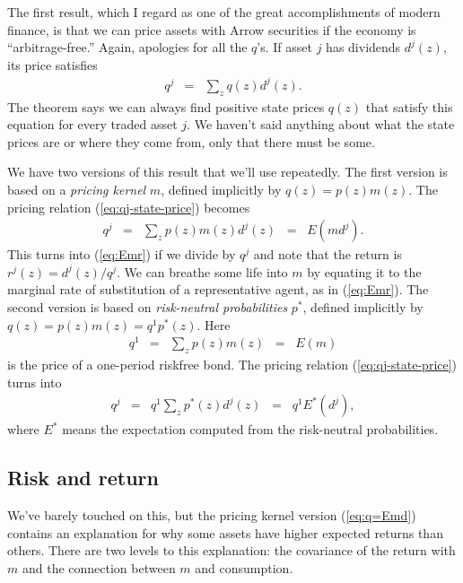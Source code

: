 \documentclass[11pt]{article}
\begin{document}
The first result, which I regard as one of the great accomplishments of modern finance,
is that we can price assets with Arrow securities if the economy is ``arbitrage-free.''
Again, apologies for all the $q$'s.
If asset $j$ has dividends $d^j(z)$, its price satisfies
\begin{eqnarray}
    q^j &=& \sum_z q(z) d^j(z) .
    \label{eq:qj-state-price}
\end{eqnarray}
The theorem says we can always find positive state prices $q(z)$ that satisfy this
equation for every traded asset $j$.
We haven't said anything about what the state prices are
or where they come from,
only that there must be some.

We have two versions of this result that we'll use repeatedly.
The first version is based on a {\it pricing kernel\/} $m$,
defined implicitly by $ q(z) = p(z) m(z)$.
The pricing relation (\ref{eq:qj-state-price}) becomes
\begin{eqnarray}
    q^j &=& \sum_z p(z) m(z) d^j(z) \;\;=\;\; E (m d^j) .
    \label{eq:q=Emd}
\end{eqnarray}
This turns into (\ref{eq:Emr})
if we divide by $q^j$ and
note that the return is $r^j(z) = d^j(z)/q^j$.
We can breathe some life into $m$ by equating it to the
marginal rate of substitution of a representative agent,
as in (\ref{eq:Emr}).
The second version is based on
{\it risk-neutral probabilities\/} $p^*$,
defined implicitly by $ q(z) = p(z) m(z) = q^1 p^*(z)$.
Here
\begin{eqnarray*}
    q^1 &=& \sum_z p(z) m(z) \;\;=\;\; E(m)
\end{eqnarray*}
is the price of a one-period riskfree bond.
The pricing relation (\ref{eq:qj-state-price}) turns into
\begin{eqnarray*}
    q^j &=& q^1 \sum_z p^*(z) d^j(z)  \;\;=\;\; q^1 E^* (d^j) ,
\end{eqnarray*}
where $E^*$ means the expectation computed from the risk-neutral probabilities.


\subsection*{Risk and return}

We've barely touched on this, but the pricing kernel
version (\ref{eq:q=Emd}) contains an explanation for why some assets have
higher expected returns than others.
There are two levels to this explanation:
the covariance of the return with $m$ and the
connection between $m$ and consumption.
\end{document}
